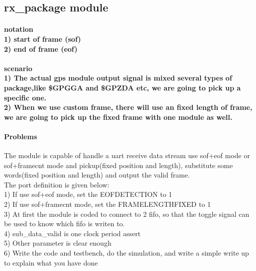 \documentclass{article}
\begin{document}
\subsection{rx\_package module}
\paragraph{notation\\1) start of frame (sof)\\
2) end of frame (eof)}

\paragraph{scenario\\1) The actual gps module output signal is mixed several types of package,like \$GPGGA and \$GPZDA etc, we are going to pick up a specific one.\\
2) When we use custom frame, there will use an fixed length of frame, we are going to pick up the fixed frame with one module as well.}

\paragraph{Problems\\}
The module is capable of handle a uart receive data stream use sof+eof mode or sof+framecnt mode and pickup(fixed position and length), substitute some words(fixed position and length) and output the valid frame.\\
The port definition is given below:\\
1) If use sof+eof mode, set the EOFDETECTION to 1 \\
2) If use sof+framecnt mode, set the FRAMELENGTHFIXED to 1\\
3) At first the module is coded to connect to 2 fifo, so that the toggle signal can be used to know which fifo is writen to.\\
4) sub\_data\_valid is one clock period assert\\
5) Other parameter is clear enough\\
6) Write the code and testbench, do the simulation, and write a simple write up to explain what you have done 
\end{document}
